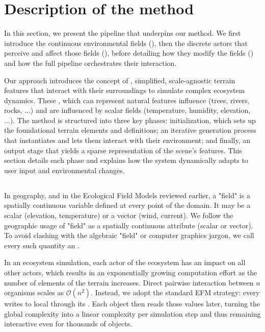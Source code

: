 \section{Description of the method}
\label{sec:env-obj-pipeline}

In this section, we present the pipeline that underpins our method.
We first introduce the continuous environmental fields (), then the discrete actors that perceive and affect those fields (), before detailing how they modify the fields () and how the full pipeline orchestrates their interaction.

Our approach introduces the concept of , simplified, scale-agnostic terrain features that interact with their surroundings to simulate complex ecosystem dynamics. These , which can represent natural features influence (trees, rivers, rocks, ...) and are influenced by scalar fields (temperature, humidity, elevation, ...). The method is structured into three key phases: initialization, which sets up the foundational terrain elements and  definitions; an iterative generation process that instantiates  and lets them interact with their environment; and finally, an output stage that yields a sparse representation of the scene's features. This section details each phase and explains how the system dynamically adapts to user input and environmental changes.

\subsection{}
\label{sec:env-obj-communication}

In geography, and in the Ecological Field Models reviewed earlier, a "field" is a spatially continuous variable defined at every point of the domain.
It may be a scalar (elevation, temperature) or a vector (wind, current). We follow the geographic usage of "field" as a spatially continuous attribute (scalar or vector). To avoid clashing with the algebraic "field" or computer graphics jargon, we call every such quantity an .

In an ecosystem simulation, each actor of the ecosystem has an impact on all other actors, which results in an exponentially growing computation effort as the number of elements of the terrain increases. Direct pairwise interaction between $n$ organisms scales as $\mathcal{O}(n^{2})$.
Instead, we adopt the standard EFM strategy: every  writes to local  through its .
Each object then reads those values later, turning the global complexity into a linear complexity per simulation step and thus remaining interactive even for thousands of objects.


